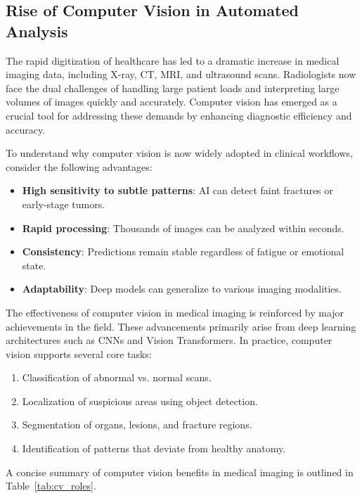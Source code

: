 \subsection{Rise of Computer Vision in Automated Analysis}

The rapid digitization of healthcare has led to a dramatic increase in medical imaging data, including X-ray, CT, MRI, and ultrasound scans. Radiologists now face the dual challenges of handling large patient loads and interpreting large volumes of images quickly and accurately. Computer vision has emerged as a crucial tool for addressing these demands by enhancing diagnostic efficiency and accuracy.

To understand why computer vision is now widely adopted in clinical workflows, consider the following advantages:

\begin{itemize}
	\item \textbf{High sensitivity to subtle patterns}: AI can detect faint fractures or early-stage tumors.
	\item \textbf{Rapid processing}: Thousands of images can be analyzed within seconds.
	\item \textbf{Consistency}: Predictions remain stable regardless of fatigue or emotional state.
	\item \textbf{Adaptability}: Deep models can generalize to various imaging modalities.
\end{itemize}

The effectiveness of computer vision in medical imaging is reinforced by major achievements in the field. These advancements primarily arise from deep learning architectures such as CNNs and Vision Transformers. In practice, computer vision supports several core tasks:

\begin{enumerate}
	\item Classification of abnormal vs. normal scans.
	\item Localization of suspicious areas using object detection.
	\item Segmentation of organs, lesions, and fracture regions.
	\item Identification of patterns that deviate from healthy anatomy.
\end{enumerate}

A concise summary of computer vision benefits in medical imaging is outlined in Table~\ref{tab:cv_roles}.

\vspace{0.3cm}

